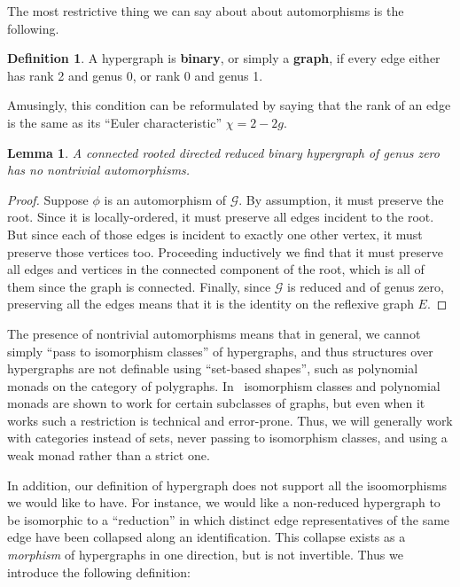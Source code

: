\documentclass{article}
\newtheorem{lem}[thm]{Lemma}
\theoremstyle{definition}
\newtheorem{defn}[thm]{Definition}
\theoremstyle{remark}
\def\G{\mathcal{G}}
\def\genus{\mathsf{genus}}
\def\rank{\mathsf{rank}}
\begin{document}
The most restrictive thing we can say about about automorphisms is the following.

\begin{defn}
  A hypergraph is \textbf{binary}, or simply a \textbf{graph}, if %
  every edge either has rank 2 and genus 0, or rank 0 and genus 1.
\end{defn}

Amusingly, this condition can be reformulated by saying that the rank of an edge is the same as its ``Euler characteristic'' $\chi=2-2g$.

\begin{lem}
  A connected rooted directed reduced binary hypergraph of genus zero has no nontrivial automorphisms.
\end{lem}
\begin{proof}
  Suppose $\phi$ is an automorphism of $\G$.
  By assumption, it must preserve the root.
  Since it is locally-ordered, it must preserve all edges incident to the root.
  But since each of those edges is incident to exactly one other vertex, it must preserve those vertices too.
  Proceeding inductively we find that it must preserve all edges and vertices in the connected component of the root, which is all of them since the graph is connected.
  Finally, since $\G$ is reduced and of genus zero, preserving all the edges means that it is the identity on the reflexive graph $E$.
\end{proof}

The presence of nontrivial automorphisms means that in general, we cannot simply ``pass to isomorphism classes'' of hypergraphs, and thus structures over hypergraphs are not definable using ``set-based shapes'', such as polynomial monads on the category of polygraphs.
In~\cite{bb:htapm} isomorphism classes and polynomial monads are shown to work for certain subclasses of graphs, but even when it works such a restriction is technical and error-prone.
Thus, we will generally work with categories instead of sets, never passing to isomorphism classes, and using a weak monad rather than a strict one.

In addition, our definition of hypergraph does not support all the isoomorphisms we would like to have.
For instance, we would like a non-reduced hypergraph to be isomorphic to a ``reduction'' in which distinct edge representatives of the same edge have been collapsed along an identification.
This collapse exists as a \emph{morphism} of hypergraphs in one direction, but is not invertible.
Thus we introduce the following definition:
\end{document}
